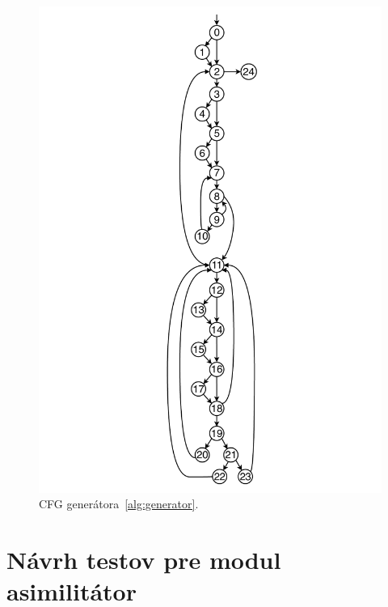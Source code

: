 \begin{figure}[h]
	\centering
	\includegraphics[height=0.7\paperheight]{obrazky/cfg_generator.pdf}
	\caption{CFG generátora~\ref{alg:generator}.}
	\label{fig:cfg_gen}
\end{figure}

\section{Návrh testov pre modul asimilitátor}

